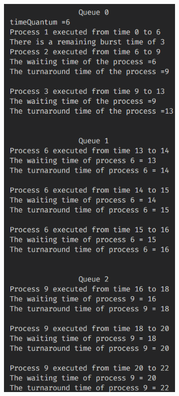 \documentclass{article}
\begin{document}
\begin{figure}[t!]
  \centering
  \begin{subfigure}[b]{0.45\textwidth}
    \includegraphics[width=\textwidth]{5.png}

\end{subfigure}
\end{figure}
\end{document}
